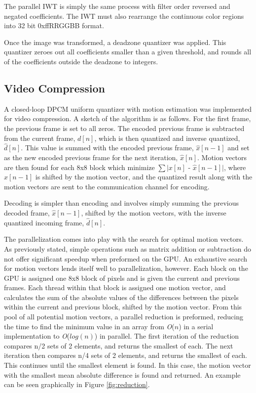 \documentclass[10pt,twocolumn,twoside]{IEEEtran}
\renewcommand{\O}[1]{\textit{O}(\ensuremath{#1})}
\begin{document}
The parallel IWT is simply the same process with filter order reversed and negated coefficients. The IWT must also rearrange the continuous color regions into 32 bit 0xffRRGGBB format.

Once the image was transformed, a deadzone quantizer was applied. This quantizer zeroes out all coefficients smaller than a given threshold, and rounds all of the coefficients outside the deadzone to integers.

\subsection{Video Compression}
A closed-loop DPCM uniform quantizer with motion estimation was implemented for video compression. A sketch of the algorithm is as follows. For the first frame, the previous frame is set to all zeros. The encoded previous frame is subtracted from the current frame, $d[n]$, which is then quantized and inverse quantized, $\hat{d}[n]$. This value is summed with the encoded previous frame, $\hat{x}[n-1]$ and set as the new encoded previous frame for the next iteration, $\hat{x}[n]$. Motion vectors are then found for each 8x8 block which minimize $\sum$$\mid$$x[n]$ - $\hat{x}[n-1]$$\mid$, where $\hat{x}[n-1]$ is shifted by the motion vector, and the quantized result along with the motion vectors are sent to the communication channel for encoding.

Decoding is simpler than encoding and involves simply summing the previous decoded frame, $\hat{x}[n-1]$, shifted by the motion vectors, with the inverse quantized incoming frame, $\hat{d}[n]$.

The parallelization comes into play with the search for optimal motion vectors. As previously stated, simple operations such as matrix addition or subtraction do not offer significant speedup when preformed on the GPU. An exhaustive search for motion vectors lends itself well to parallelization, however. Each block on the GPU is assigned one 8x8 block of pixels and is given the current and previous frames. Each thread within that block is assigned one motion vector, and calculates the sum of the absolute values of the differences between the pixels within the current and previous block, shifted by the motion vector. From this pool of all potential motion vectors, a parallel reduction is preformed, reducing the time to find the minimum value in an array from \O{n} in a serial implementation to \O{log(n)} in parallel. The first iteration of the reduction compares n/2 sets of 2 elements, and returns the smallest of each. The next iteration then compares n/4 sets of 2 elements, and returns the smallest of each. This continues until the smallest element is found. In this case, the motion vector with the smallest mean absolute difference is found and returned. An example can be seen graphically in Figure \ref{fig:reduction}.
\end{document}
